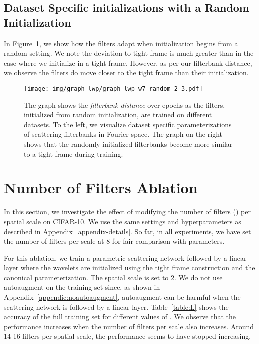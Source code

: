 \documentclass[10pt,twocolumn,letterpaper]{article}
\begin{document}
\begin{table*}[t]
\subsection{Dataset Specific initializations with a Random Initialization}\label{appendix:random-init}
In Figure~\ref{fig:graphlwp_random}, we show how the filters adapt when initialization begins from a random setting. We note the deviation to tight frame is much greater than in the case where we initialize in a tight frame. However, as per our filterbank distance, we observe the filters do move closer to the tight frame than their initialization.
\begin{figure}[H]
    \centering
\texttt{[image: img/graph\_lwp/graph\_lwp\_w7\_random\_2-3.pdf]}
    \vspace{-7pt}
    \caption{The graph shows the \textit{filterbank distance} over epochs as the filters, initialized from random initialization, are trained on different datasets. To the left, we visualize dataset specific parameterizations of scattering filterbanks in Fourier space. The graph on the right shows that the randomly initialized filterbanks become more similar to a tight frame during training.}
    \label{fig:graphlwp_random}
\end{figure}

\section{Number of Filters Ablation}
\label{appendix:num_filter}
In this section, we investigate the effect of modifying the number of filters () per spatial scale on CIFAR-10. We use the same settings and hyperparameters as described in Appendix~\ref{appendix-details}. So far, in all experiments, we have set the number of filters per scale at 8 for fair comparison with parameters.

For this ablation, we train a parametric scattering network followed by a linear layer where the wavelets are initialized using the tight frame construction and the canonical parameterization. The spatial scale is set to 2. We do not use autoaugment on the training set since, as shown in Appendix~\ref{appendic:noautoaugment}, autoaugment can be harmful when the scattering network is followed by a linear layer. Table~\ref{table:L} shows the accuracy of the full training set for different values of . We observe that the performance increases when the number of filters per scale also increases. Around 14-16 filters per spatial scale, the performance seems to have stopped increasing. 


\end{table*}
\end{document}
